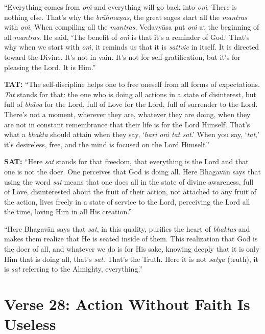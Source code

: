 \documentclass[12pt, twoside, openright]{memoir}
\begin{document}
\enquote{Everything comes from \textit{oṁ} and everything will go back into \textit{oṁ}. There is nothing else. That’s why the \textit{brāhmaṇas}, the great sages start all the \textit{mantras} with \textit{oṁ}. When compiling all the \textit{mantras}, Vedavyāsa put \textit{oṁ} at the beginning of all \textit{mantras}. He said, \enquote{The benefit of \textit{oṁ} is that it’s a reminder of God.} That’s why when we start with \textit{oṁ}, it reminds us that it is \textit{sattvic} in itself. It is directed toward the Divine. It’s not in vain. It’s not for self-gratification, but it’s for pleasing the Lord. It is Him.}

\textbf{TAT:} \enquote{The self-discipline helps one to free oneself from all forms of expectations. \textit{Tat} stands for that: the one who is doing all actions in a state of disinterest, but full of \textit{bhāva} for the Lord, full of Love for the Lord, full of surrender to the Lord. There’s not a moment, wherever they are, whatever they are doing, when they are not in constant remembrance that their life is for the Lord Himself. That’s what a \textit{bhakta} should attain when they say, \enquote{\textit{hari oṁ tat sat}.} When you say, \enquote{\textit{tat},} it’s desireless, free, and the mind is focused on the Lord Himself.}

\textbf{SAT:} \enquote{Here \textit{sat} stands for that freedom, that everything is the Lord and that one is not the doer. One perceives that God is doing all. Here Bhagavān says that using the word \textit{sat} means that one does all in the state of divine awareness, full of Love, disinterested about the fruit of their action, not attached to any fruit of the action, lives freely in a state of service to the Lord, perceiving the Lord all the time, loving Him in all His creation.}

\enquote{Here Bhagavān says that \textit{sat}, in this quality, purifies the heart of \textit{bhaktas} and makes them realize that He is seated inside of them. This realization that God is the doer of all, and whatever we do is for His sake, knowing deeply that it is only Him that is doing all, that’s \textit{sat}. That’s the Truth. Here it is not \textit{satya} (truth), it is \textit{sat} referring to the Almighty, everything.}
\section{Verse 28: Action Without Faith Is Useless}\label{sec-verse-28-action-without-faith-is-useless}
\end{document}
